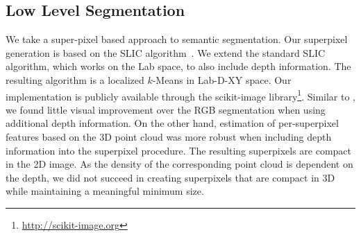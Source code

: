\subsection{Low Level Segmentation}
We take a super-pixel based approach to semantic segmentation.
Our superpixel generation is based on the SLIC algorithm~\citep{achanta2012slic}. We extend the
standard SLIC algorithm, which works on the Lab space, to also include 
depth information. The resulting algorithm is a localized $k$-Means in Lab-D-XY space.
Our implementation is publicly available through the scikit-image library\footnote{\url{http://scikit-image.org}}.
Similar to \citet{SilbermanECCV12}, we found little visual improvement over the
RGB segmentation when using additional depth information. On the other hand,
estimation of per-superpixel features based on the 3D point cloud was more
robust when including depth information into the superpixel procedure.
The resulting superpixels are compact in the 2D image. As the density of the
corresponding point cloud is dependent on the depth, we did not succeed in
creating superpixels that are compact in 3D while maintaining a meaningful
minimum size.

